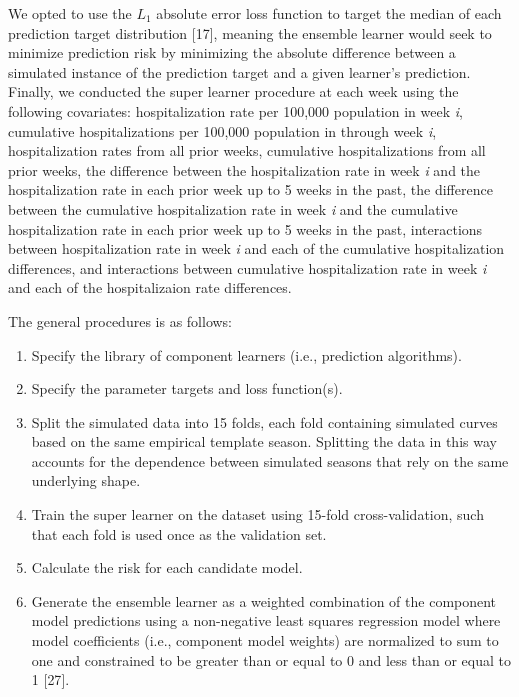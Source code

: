 \documentclass[10pt,letterpaper]{article}
\begin{document}
We opted to use the \(L_1\) absolute error loss function to target the
median of each prediction target distribution {[}17{]}, meaning the
ensemble learner would seek to minimize prediction risk by minimizing
the absolute difference between a simulated instance of the prediction
target and a given learner's prediction. Finally, we conducted the super
learner procedure at each week using the following covariates:
hospitalization rate per 100,000 population in week \emph{i}, cumulative
hospitalizations per 100,000 population in through week \emph{i},
hospitalization rates from all prior weeks, cumulative hospitalizations
from all prior weeks, the difference between the hospitalization rate in
week \emph{i} and the hospitalization rate in each prior week up to 5
weeks in the past, the difference between the cumulative hospitalization
rate in week \emph{i} and the cumulative hospitalization rate in each
prior week up to 5 weeks in the past, interactions between
hospitalization rate in week \emph{i} and each of the cumulative
hospitalization differences, and interactions between cumulative
hospitalization rate in week \emph{i} and each of the hospitalizaion
rate differences.

The general procedures is as follows:

\begin{enumerate}
\def\labelenumi{\arabic{enumi}.}
\item
  Specify the library of component learners (i.e., prediction
  algorithms).
\item
  Specify the parameter targets and loss function(s).
\item
  Split the simulated data into 15 folds, each fold containing simulated
  curves based on the same empirical template season. Splitting the data
  in this way accounts for the dependence between simulated seasons that
  rely on the same underlying shape.
\item
  Train the super learner on the dataset using 15-fold cross-validation,
  such that each fold is used once as the validation set.
\item
  Calculate the risk for each candidate model.
\item
  Generate the ensemble learner as a weighted combination of the
  component model predictions using a non-negative least squares
  regression model where model coefficients (i.e., component model
  weights) are normalized to sum to one and constrained to be greater
  than or equal to 0 and less than or equal to 1 {[}27{]}.
\end{enumerate}
\end{document}
